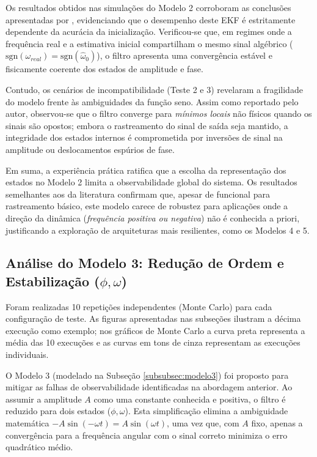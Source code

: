 \documentclass[a4paper,12pt]{article}
\begin{document}
Os resultados obtidos nas simulações do Modelo 2  corroboram as conclusões apresentadas por , evidenciando que o desempenho deste EKF é estritamente dependente da acurácia da inicialização. Verificou-se que, em regimes onde a frequência real e a estimativa inicial compartilham o mesmo sinal algébrico ($\mathrm{sgn}(\omega_{real}) = \mathrm{sgn}(\hat{\omega}_0)$), o filtro apresenta uma convergência estável e fisicamente coerente dos estados de amplitude e fase.

Contudo, os cenários de incompatibilidade (Teste 2 e 3) revelaram a fragilidade do modelo frente às ambiguidades da função seno. Assim como reportado pelo autor, observou-se que o filtro converge para \textit{mínimos locais} não físicos quando os sinais são opostos; embora o rastreamento do sinal de saída seja mantido, a integridade dos estados internos é comprometida por inversões de sinal na amplitude ou deslocamentos espúrios de fase. 

Em suma, a experiência prática ratifica que a escolha da representação dos estados no Modelo 2 limita a observabilidade global do sistema. Os resultados semelhantes aos da literatura confirmam que, apesar de funcional para rastreamento básico, este modelo carece de robustez para aplicações onde a direção da dinâmica (\textit{frequência positiva ou negativa}) não é conhecida a priori, justificando a exploração de arquiteturas mais resilientes, como os Modelos 4 e 5.

\subsection{Análise do Modelo 3: Redução de Ordem e Estabilização ($\phi, \omega$)}
\label{subsec:resultados_mod3}

Foram realizadas 10 repetições independentes (Monte Carlo) para cada configuração de teste. As figuras apresentadas nas subseções ilustram a décima execução como exemplo; nos gráficos de Monte Carlo a curva preta representa a média das 10 execuções e as curvas em tons de cinza representam as execuções individuais.

O Modelo 3 (modelado na Subseção \ref{subsubsec:modelo3}) foi proposto para mitigar as falhas de observabilidade identificadas na abordagem anterior. Ao assumir a amplitude $A$ como uma constante conhecida e positiva, o filtro é reduzido para dois estados ($\phi, \omega$). Esta simplificação elimina a ambiguidade matemática $-A \sin(-\omega t) = A \sin(\omega t)$, uma vez que, com $A$ fixo, apenas a convergência para a frequência angular com o sinal correto minimiza o erro quadrático médio.
\end{document}
